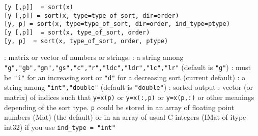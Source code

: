 
\begin{mandesc}
\end{mandesc}

\begin{calling_sequence}
\begin{verbatim}
[y [,p]]  = sort(x)
[y [,p]] = sort(x, type=type_of_sort, dir=order)
[y, p] = sort(x, type=type_of_sort, dir=order, ind_type=ptype)
[y [,p]]  = sort(x, type_of_sort, order)
[y, p]  = sort(x, type_of_sort, order, ptype)
\end{verbatim}
\end{calling_sequence}
\begin{parameters}
  \begin{varlist}
    :  matrix or vector of numbers or strings.
    : a string among
    \verb+"g","gb","gm","gs","c","r","ldc","ldr","lc","lr"+ (default
    is \verb+"g"+)
    : must be \verb+"i"+ for an increasing sort or \verb+"d"+ for a
                    decreasing sort (current default)
    : a string among
    \verb+"int","double"+ (default is \verb+"double"+)
    : sorted output
    : vector (or matrix) of indices such that \verb+y=x(p)+
    or  \verb+y=x(:,p)+ or  \verb+y=x(p,:)+ or other meanings
    depending of the sort type. \verb+p+ could be stored in an array of
    floating point numbers (Mat) (the default) or in an array of 
    usual C integers (IMat of itype int32) if you use \verb+ind_type = "int"+
  \end{varlist}
\end{parameters}


